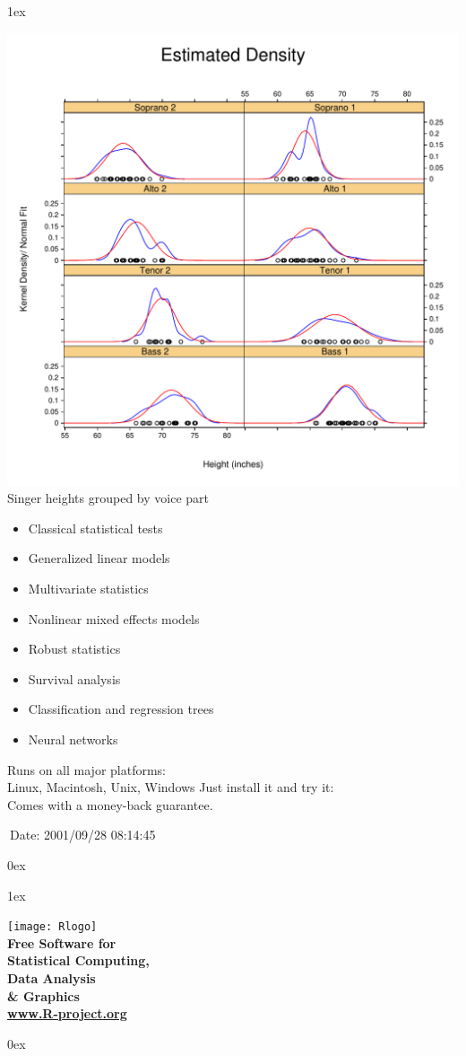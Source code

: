 \documentclass[landscape]{article}
\newlength{\colw}
\newcommand{\column}[1]{\hspace*{9mm}{}
  \parbox[t][0.99\textheight][t]{\colw}{\parskip1ex
    #1\parskip0ex}\hspace{9mm}{}}
\begin{document}
\column{
  \begin{center}
    \footnotesize\sf
    \includegraphics[width=\colw]{lattice-density}
    Singer heights grouped by voice part
  \end{center}

  \vfill
  \flushleft
  \begin{itemize}
   \item Classical statistical tests
   \item Generalized linear models
   \item Multivariate statistics
   \item Nonlinear mixed effects models
   \item Robust statistics
   \item Survival analysis
   \item Classification and regression trees
   \item Neural networks
  \end{itemize}
  \vfill
  Runs on all major platforms:\\
  Linux, Macintosh, Unix, Windows
  \vfill
  Just install it and try it:\\  Comes with a money-back guarantee.

  \begin{flushright}\tiny
   $\ $Date: 2001/09/28 08:14:45 $\ $
  \end{flushright}
}
\column{
    \vfill
  \begin{center}
    \texttt{[image: Rlogo]}\\[2cm]
    \bf
    \Large
    Free Software for\\[1cm]
    \Huge
    Statistical Computing,\\ Data Analysis\\ \& Graphics\\[1cm]
    \Large
    \url{www.R-project.org}
  \end{center}
  \vfill
  }
\end{document}
